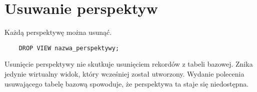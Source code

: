 \documentclass{article}
\begin{document}
\pagebreak

\section{Usuwanie perspektyw}

Każdą perspektywę można usunąć.

\begin{verbatim}
    DROP VIEW nazwa_perspektywy;
\end{verbatim}

Usunięcie perspektywy nie skutkuje usunięciem rekordów z tabeli bazowej. Znika jedynie wirtualny widok, który wcześniej został utworzony. Wydanie polecenia usuwającego tabelę bazową spowoduje, że perspektywa ta staje się niedostępna.
\end{document}
